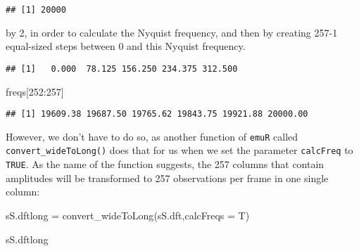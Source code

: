 \documentclass[
]{book}
\newenvironment{Shaded}{\begin{snugshade}}{\end{snugshade}}
\newcommand{\AttributeTok}[1]{\textcolor[rgb]{0.77,0.63,0.00}{#1}}
\newcommand{\DecValTok}[1]{\textcolor[rgb]{0.00,0.00,0.81}{#1}}
\newcommand{\FunctionTok}[1]{\textcolor[rgb]{0.00,0.00,0.00}{#1}}
\newcommand{\NormalTok}[1]{#1}
\newcommand{\OtherTok}[1]{\textcolor[rgb]{0.56,0.35,0.01}{#1}}
\newcommand{\SpecialCharTok}[1]{\textcolor[rgb]{0.00,0.00,0.00}{#1}}
\begin{document}
\begin{Shaded}
\end{Shaded}

\begin{verbatim}
## [1] 20000
\end{verbatim}

by 2, in order to calculate the Nyquist frequency, and then by creating 257-1 equal-sized steps between 0 and this Nyquist frequency.

\begin{Shaded}
\end{Shaded}

\begin{verbatim}
## [1]   0.000  78.125 156.250 234.375 312.500
\end{verbatim}

\begin{Shaded}
\begin{Highlighting}[]
\NormalTok{freqs[}\DecValTok{252}\SpecialCharTok{:}\DecValTok{257}\NormalTok{]}
\end{Highlighting}
\end{Shaded}

\begin{verbatim}
## [1] 19609.38 19687.50 19765.62 19843.75 19921.88 20000.00
\end{verbatim}

However, we don't have to do so, as another function of \texttt{emuR} called \texttt{convert\_wideToLong()} does that for us when we set the parameter \texttt{calcFreq} to \texttt{TRUE}. As the name of the function suggests, the 257 columns that contain amplitudes will be transformed to 257 observations per frame in one single column:

\begin{Shaded}
\begin{Highlighting}[]
\NormalTok{sS.dftlong }\OtherTok{=} \FunctionTok{convert\_wideToLong}\NormalTok{(sS.dft,}\AttributeTok{calcFreqs =}\NormalTok{ T)}

\NormalTok{sS.dftlong}
\end{Highlighting}
\end{Shaded}
\end{document}
